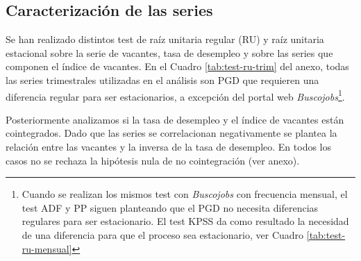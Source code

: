\documentclass[12pt,oneside]{reedthesis}
\begin{document}
\hypertarget{caracterizaciuxf3n-de-las-series}{%
\subsection{Caracterización de las series}\label{caracterizaciuxf3n-de-las-series}}

Se han realizado distintos test de raíz unitaria regular (RU) y raíz unitaria estacional sobre la serie de vacantes, tasa de desempleo y sobre las series que componen el índice de vacantes. En el Cuadro \ref{tab:test-ru-trim} del anexo, todas las series trimestrales utilizadas en el análisis son PGD que requieren una diferencia regular para ser estacionarios, a excepción del portal web \emph{Buscojobs}\footnote{Cuando se realizan los mismos test con \emph{Buscojobs} con frecuencia mensual, el test ADF y PP siguen planteando que el PGD no necesita diferencias regulares para ser estacionario. El test KPSS da como resultado la necesidad de una diferencia para que el proceso sea estacionario, ver Cuadro \ref{tab:test-ru-mensual}}.

Posteriormente analizamos si la tasa de desempleo y el índice de vacantes están cointegrados. Dado que las series se correlacionan negativamente se plantea la relación entre las vacantes y la inversa de la tasa de desempleo. En todos los casos no se rechaza la hipótesis nula de no cointegración (ver anexo).
\end{document}
